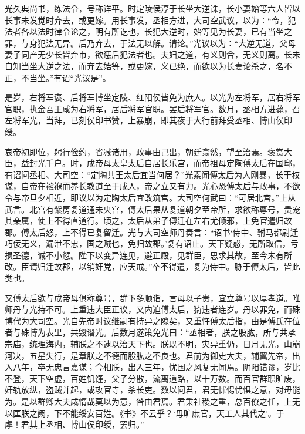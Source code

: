 \documentclass[12pt,UTF8]{ctexbook}
\begin{document}
光久典尚书，练法令，号称详平。时定陵侯淳于长坐大逆诛，长小妻始等六人皆以长事未发觉时弃去，或更嫁。用长事发，丞相方进，大司空武议，以为：“令，犯法者各以法时律令论之，明有所讫也，长犯大逆时，始等见为长妻，已有当坐之罪，与身犯法无异。后乃弃去，于法无以解。请论。”光议以为：“大逆无道，父母妻子同产无少长皆弃市，欲惩后犯法者也。夫妇之道，有义则合，无义则离。长未自知当坐大逆之法，而弃去始等，或更嫁，义已绝，而欲以为长妻论杀之，名不正，不当坐。”有诏“光议是”。



是岁，右将军褒、后将军博坐定陵、红阳侯皆免为庶人。以光为左将军，居右将军官职，执金吾王咸为右将军，居后将军官职。罢后将军官。数月，丞相方进薨，召左将军光，当拜，已刻侯印书赞，上暴崩，即其夜于大行前拜受丞相、博山侯印绶。



哀帝初即位，躬行俭约，省减诸用，政事由己出，朝廷翕然，望至治焉。褒赏大臣，益封光千户。时，成帝母太皇太后自居长乐宫，而帝祖母定陶傅太后在国邸，有诏问丞相、大司空：“定陶共王太后宜当何居？”光素闻傅太后为人刚暴，长于权谋，自帝在襁褓而养长教道至于成人，帝之立又有力。光心恐傅太后与政事，不欲令与帝旦夕相近，即议以为定陶太后宜改筑宫。大司空何武曰：“可居北宫。”上从武言。北宫有紫房复道通未央宫，傅太后果从复道朝夕至帝所，求欲称尊号，贵宠其亲属，使上不得直道行。顷之，太后从弟子傅迁在左右尤倾邪，上免官遣归故郡。傅太后怒，上不得已复留迁。光与大司空师丹奏言：“诏书‘侍中、驸马都尉迁巧佞无义，漏泄不忠，国之贼也，免归故郡。’复有诏止。天下疑惑，无所取信，亏损圣德，诚不小愆。陛下以变异连见，避正殿，见群臣，思求其故，至今未有所改。臣请归迁故郡，以销奸党，应天戒。”卒不得遣，复为侍中。胁于傅太后，皆此类也。



又傅太后欲与成帝母俱称尊号，群下多顺诣，言母以子贵，宜立尊号以厚孝道。唯师丹与光持不可。上重违大臣正议，又内迫傅太后，猗违者连岁。丹以罪免，而硃博代为大司空。光自先帝时议继嗣有持异之隙矣，又重忤傅太后指，由是傅氏在位者与硃博为表里，共毁谮光。后数月遂策免光曰：“丞相者，朕之股肱，所与共承宗庙，统理海内，辅朕之不逮以治天下也。朕既不明，灾异重仍，日月无光，山崩河决，五星失行，是章朕之不德而股肱之不良也。君前为御史大夫，辅翼先帝，出入八年，卒无忠言嘉谋；今相朕，出入三年，忧国之风复无闻焉。阴阳错谬，岁比不登，天下空虚，百姓饥馑，父子分散，流离道路，以十万数。而百官群职旷废，奸轨放纵，盗贼并起，或攻官寺，杀长吏。数以问君，君无怵惕忧惧之意，对毋能为。是以群卿大夫咸惰哉莫以为意，咎由君焉。君秉社稷之重，总百僚之任，上无以匡朕之阙，下不能绥安百姓。《书》不云乎？‘毋旷庶官，天工人其代之’。于虖！君其上丞相、博山侯印绶，罢归。”
\end{document}
